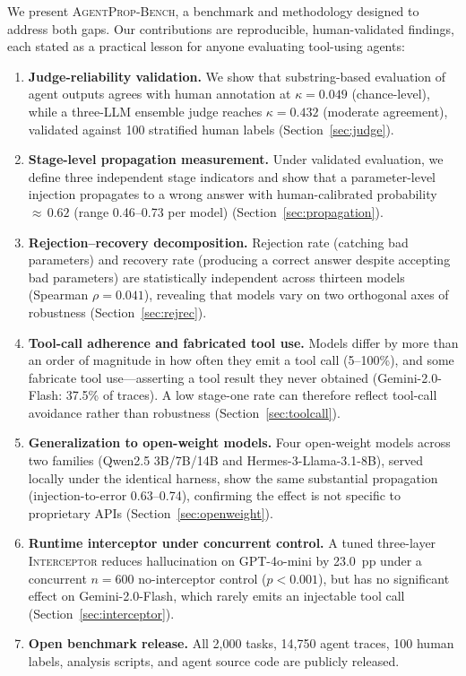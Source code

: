\documentclass{ieeeaccess}
\newcommand{\bench}{\textsc{AgentProp-Bench}\xspace}
\newcommand{\interceptor}{\textsc{Interceptor}\xspace}
\begin{document}
We present \bench{}, a benchmark and methodology designed to address
both gaps.
Our contributions are reproducible, human-validated findings, each stated as a
practical lesson for anyone evaluating tool-using agents:
\begin{enumerate}
  \item \textbf{Judge-reliability validation.}
    We show that substring-based evaluation of agent outputs agrees with
    human annotation at $\kappa{=}0.049$ (chance-level), while a
    three-LLM ensemble judge reaches $\kappa{=}0.432$ (moderate
    agreement), validated against 100 stratified human labels
    (Section~\ref{sec:judge}).
  \item \textbf{Stage-level propagation measurement.}
    Under validated evaluation, we define three independent stage
    indicators and show that a parameter-level injection propagates to a
    wrong answer with human-calibrated probability ${\approx}\,0.62$
    (range 0.46--0.73 per model) (Section~\ref{sec:propagation}).
  \item \textbf{Rejection--recovery decomposition.}
    Rejection rate (catching bad parameters) and recovery rate (producing
    a correct answer despite accepting bad parameters) are statistically
    independent across thirteen models (Spearman $\rho{=}0.041$),
    revealing that models vary on two orthogonal axes of
    robustness (Section~\ref{sec:rejrec}).
  \item \textbf{Tool-call adherence and fabricated tool use.}
    Models differ by more than an order of magnitude in how often they
    emit a tool call (5--100\%), and some fabricate tool use---asserting a
    tool result they never obtained (Gemini-2.0-Flash: 37.5\% of traces).
    A low stage-one rate can therefore reflect tool-call avoidance rather
    than robustness (Section~\ref{sec:toolcall}).
  \item \textbf{Generalization to open-weight models.}
    Four open-weight models across two families (Qwen2.5 3B/7B/14B and
    Hermes-3-Llama-3.1-8B), served locally under the identical harness, show
    the same substantial propagation (injection-to-error 0.63--0.74),
    confirming the effect is not specific to proprietary APIs
    (Section~\ref{sec:openweight}).
  \item \textbf{Runtime interceptor under concurrent control.}
    A tuned three-layer \interceptor{} reduces hallucination on
    GPT-4o-mini by 23.0~pp under a concurrent $n{=}600$ no-interceptor
    control ($p < 0.001$), but has no significant effect on
    Gemini-2.0-Flash, which rarely emits an injectable tool call
    (Section~\ref{sec:interceptor}).
  \item \textbf{Open benchmark release.}
    All 2{,}000 tasks, 14{,}750 agent traces, 100 human labels, analysis
    scripts, and agent source code are publicly released.
\end{enumerate}
\end{document}
